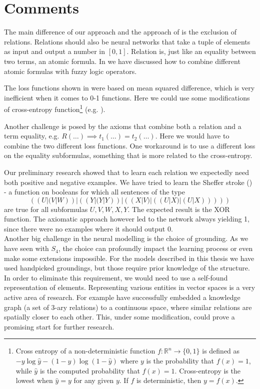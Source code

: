 \chapter{Comments}
\label{comments}
The main difference of our approach and the approach of \cite{serafini} is the exclusion of relations. Relations should also be neural networks that take a tuple of elements as input and output a number in $[0,1]$. Relation is, just like an equality between two terms, an atomic formula. In  we have discussed how to combine different atomic formulas with fuzzy logic operators.

The loss functions shown in  were based on mean squared difference, which is very inefficient when it comes to 0-1 functions. Here we could use some modifications of cross-entropy function\footnote{Cross entropy of a non-deterministic function $f:\mathbb{R}^n\rightarrow \{0,1\}$ is defined as $-y\log\widehat{y}-(1-y)\log(1-\widehat{y})$ where $y$ is the probability that $f(x)=1$, while $\widehat{y}$ is the computed probability that $f(x)=1$. Cross-entropy is the lowest when $\widehat{y}=y$ for any given $y$. If $f$ is deterministic, then $y=f(x)$.} (e.g. \cite{crossentropy}).

Another challenge is posed by the axioms that combine both a relation and a term equality, e.g. $R(\dots)\implies t_1(\dots)=t_2(\dots)$. Here we would have to combine the two different loss functions. One workaround is to use a different loss on the equality subformulas, something that is more related to the cross-entropy.

Our preliminary research showed that to learn each relation we expectedly need both positive and negative examples. We have tried to learn the Sheffer stroke (\cite{sheffer}) - a function on booleans for which all sentences of the type $$((U|(V|W))|((Y|(Y|Y))|((X|V)|((U|X)|(U|X)))))$$ are true for all subformulas $U,V,W,X,Y$. The expected result is the XOR function. The axiomatic approach however led to the network always yielding 1, since there were no examples where it should output 0.\\

Another big challenge in the neural modelling is the choice of grounding. As we have seen with $S_4$, the choice can profoundly impact the learning process or even make some extensions impossible. For the models described in this thesis we have used handpicked groundings, but those require prior knowledge of the structure. In order to eliminate this requirement, we would need to use a self-found representation of elements. Representing various entities in vector spaces is a very active area of research. For example \cite{grounding_wang} have successfully embedded a knowledge graph (a set of 3-ary relations) to a continuous space, where similar relations are spatially closer to each other. This, under some modification, could prove a promising start for further research.\\

